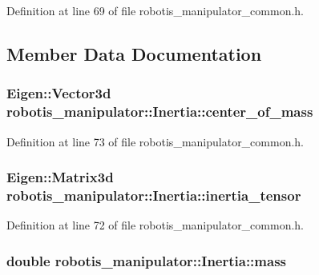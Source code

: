 Definition at line 69 of file robotis\+\_\+manipulator\+\_\+common.\+h.



\subsection{Member Data Documentation}
\subsubsection[{\texorpdfstring{center\+\_\+of\+\_\+mass}{center_of_mass}}]{\setlength{\rightskip}{0pt plus 5cm}Eigen\+::\+Vector3d robotis\+\_\+manipulator\+::\+Inertia\+::center\+\_\+of\+\_\+mass}\hypertarget{structrobotis__manipulator_1_1_inertia_a8d7158602370b1abf0b690a6483376b7}{}\label{structrobotis__manipulator_1_1_inertia_a8d7158602370b1abf0b690a6483376b7}


Definition at line 73 of file robotis\+\_\+manipulator\+\_\+common.\+h.

\subsubsection[{\texorpdfstring{inertia\+\_\+tensor}{inertia_tensor}}]{\setlength{\rightskip}{0pt plus 5cm}Eigen\+::\+Matrix3d robotis\+\_\+manipulator\+::\+Inertia\+::inertia\+\_\+tensor}\hypertarget{structrobotis__manipulator_1_1_inertia_a61b16b0ad0ac7366fe046b946c04c97e}{}\label{structrobotis__manipulator_1_1_inertia_a61b16b0ad0ac7366fe046b946c04c97e}


Definition at line 72 of file robotis\+\_\+manipulator\+\_\+common.\+h.

\subsubsection[{\texorpdfstring{mass}{mass}}]{\setlength{\rightskip}{0pt plus 5cm}double robotis\+\_\+manipulator\+::\+Inertia\+::mass}\hypertarget{structrobotis__manipulator_1_1_inertia_a8e25738415288febca11a62124736bab}{}\label{structrobotis__manipulator_1_1_inertia_a8e25738415288febca11a62124736bab}


